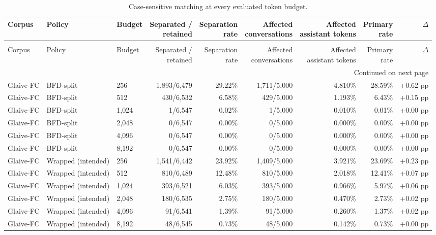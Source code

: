 \begin{longtable}{lllrrrrrr}
\caption{Case-sensitive matching at every evaluated token budget.}
\label{tab:case-all} \\
\toprule
Corpus & Policy & Budget & \shortstack{Separated /\\retained} & \shortstack{Separation\\rate} & \shortstack{Affected\\conversations} & \shortstack{Affected\\assistant tokens} & \shortstack{Primary\\rate} & $\Delta$ \\
\midrule
\endfirsthead

\caption[]{Case-sensitive matching at every evaluated token budget.} \\
\toprule
Corpus & Policy & Budget & \shortstack{Separated /\\retained} & \shortstack{Separation\\rate} & \shortstack{Affected\\conversations} & \shortstack{Affected\\assistant tokens} & \shortstack{Primary\\rate} & $\Delta$ \\
\midrule
\endhead

\midrule
\multicolumn{9}{r}{Continued on next page} \\
\midrule
\endfoot

\bottomrule
\endlastfoot

Glaive-FC & BFD-split & 256 & 1,893/6,479 & 29.22\% & 1,711/5,000 & 4.810\% & 28.59\% & +0.62 pp \\
Glaive-FC & BFD-split & 512 & 430/6,532 & 6.58\% & 429/5,000 & 1.193\% & 6.43\% & +0.15 pp \\
Glaive-FC & BFD-split & 1,024 & 1/6,547 & 0.02\% & 1/5,000 & 0.010\% & 0.01\% & +0.00 pp \\
Glaive-FC & BFD-split & 2,048 & 0/6,547 & 0.00\% & 0/5,000 & 0.000\% & 0.00\% & +0.00 pp \\
Glaive-FC & BFD-split & 4,096 & 0/6,547 & 0.00\% & 0/5,000 & 0.000\% & 0.00\% & +0.00 pp \\
Glaive-FC & BFD-split & 8,192 & 0/6,547 & 0.00\% & 0/5,000 & 0.000\% & 0.00\% & +0.00 pp \\
Glaive-FC & Wrapped (intended) & 256 & 1,541/6,442 & 23.92\% & 1,409/5,000 & 3.921\% & 23.69\% & +0.23 pp \\
Glaive-FC & Wrapped (intended) & 512 & 810/6,489 & 12.48\% & 810/5,000 & 2.018\% & 12.41\% & +0.07 pp \\
Glaive-FC & Wrapped (intended) & 1,024 & 393/6,521 & 6.03\% & 393/5,000 & 0.966\% & 5.97\% & +0.06 pp \\
Glaive-FC & Wrapped (intended) & 2,048 & 180/6,535 & 2.75\% & 180/5,000 & 0.470\% & 2.73\% & +0.02 pp \\
Glaive-FC & Wrapped (intended) & 4,096 & 91/6,541 & 1.39\% & 91/5,000 & 0.260\% & 1.37\% & +0.02 pp \\
Glaive-FC & Wrapped (intended) & 8,192 & 48/6,545 & 0.73\% & 48/5,000 & 0.142\% & 0.73\% & +0.00 pp \\


\end{longtable}
